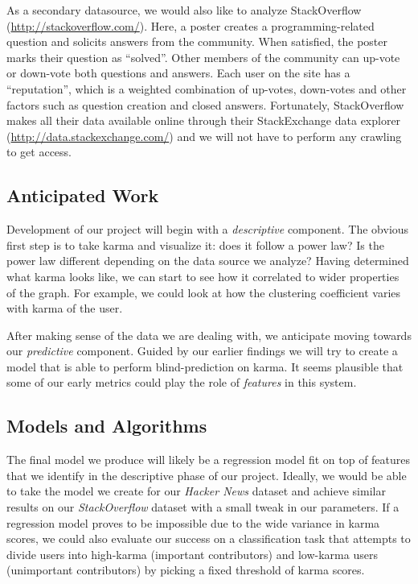 \documentclass[10pt]{article}
\begin{document}
As a secondary datasource, we would also like to analyze StackOverflow
(\url{http://stackoverflow.com/}). Here, a poster creates a programming-related
question and solicits answers from the community. When satisfied, the poster
marks their question as ``solved''. Other members of the community can up-vote
or down-vote both questions and answers. Each user on the site has a
``reputation'', which is a weighted combination of up-votes, down-votes and
other factors such as question creation and closed answers. Fortunately,
StackOverflow makes all their data available online through their StackExchange
data explorer (\url{http://data.stackexchange.com/}) and we will not have to
perform any crawling to get access.

\subsection{Anticipated Work}
Development of our project will begin with a \textit{descriptive} component. The
obvious first step is to take karma and visualize it: does it follow a power
law?  Is the power law different depending on the data source we analyze? Having
determined what karma looks like, we can start to see how it correlated to wider
properties of the graph. For example, we could look at how the clustering
coefficient varies with karma of the user.

After making sense of the data we are dealing with, we anticipate moving towards
our \textit{predictive} component. Guided by our earlier findings we will try to
create a model that is able to perform blind-prediction on karma. It seems
plausible that some of our early metrics could play the role of
\textit{features} in this system.

\subsection{Models and Algorithms}
\label{sec:models}
The final model we produce will likely be a regression model fit on top of
features that we identify in the descriptive phase of our project. Ideally, we
would be able to take the model we create for our \textit{Hacker News} dataset
and achieve similar results on our \textit{StackOverflow} dataset with a small tweak
in our parameters. If a regression model proves to be impossible due to the wide
variance in karma scores, we could also evaluate our success on a classification
task that attempts to divide users into high-karma (important contributors) and
low-karma users (unimportant contributors) by picking a fixed threshold of karma
scores.
\end{document}
